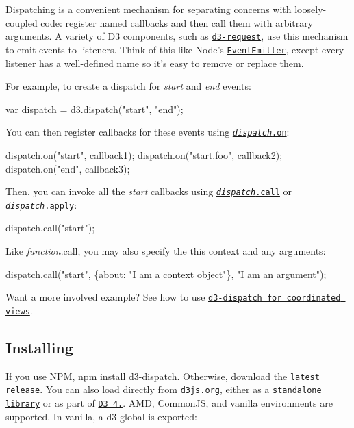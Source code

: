 Dispatching is a convenient mechanism for separating concerns with loosely-\/coupled code\+: register named callbacks and then call them with arbitrary arguments. A variety of D3 components, such as \href{https://github.com/d3/d3-request}{\tt d3-\/request}, use this mechanism to emit events to listeners. Think of this like Node’s \href{https://nodejs.org/api/events.html}{\tt Event\+Emitter}, except every listener has a well-\/defined name so it’s easy to remove or replace them.

For example, to create a dispatch for {\itshape start} and {\itshape end} events\+:


\begin{DoxyCode}
var dispatch = d3.dispatch("start", "end");
\end{DoxyCode}


You can then register callbacks for these events using \href{#dispatch_on}{\tt {\itshape dispatch}.on}\+:


\begin{DoxyCode}
dispatch.on("start", callback1);
dispatch.on("start.foo", callback2);
dispatch.on("end", callback3);
\end{DoxyCode}


Then, you can invoke all the {\itshape start} callbacks using \href{#dispatch_call}{\tt {\itshape dispatch}.call} or \href{#dispatch_apply}{\tt {\itshape dispatch}.apply}\+:


\begin{DoxyCode}
dispatch.call("start");
\end{DoxyCode}


Like {\itshape function}.call, you may also specify the {\ttfamily this} context and any arguments\+:


\begin{DoxyCode}
dispatch.call("start", \{about: "I am a context object"\}, "I am an argument");
\end{DoxyCode}


Want a more involved example? See how to use \href{http://bl.ocks.org/mbostock/5872848}{\tt d3-\/dispatch for coordinated views}.

\subsection*{Installing}

If you use N\+PM, {\ttfamily npm install d3-\/dispatch}. Otherwise, download the \href{https://github.com/d3/d3-dispatch/releases/latest}{\tt latest release}. You can also load directly from \href{https://d3js.org}{\tt d3js.\+org}, either as a \href{https://d3js.org/d3-dispatch.v1.min.js}{\tt standalone library} or as part of \href{https://github.com/d3/d3}{\tt D3 4.}. A\+MD, Common\+JS, and vanilla environments are supported. In vanilla, a {\ttfamily d3} global is exported\+:


